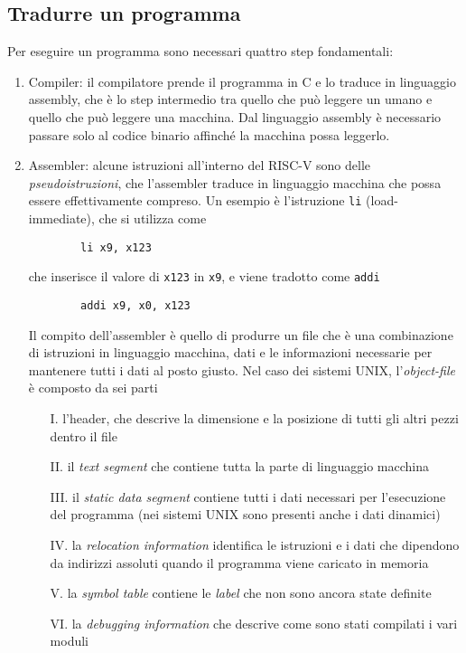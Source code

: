 \documentclass[a4paper,12pt]{article}
\theoremstyle{break}
\newcommand{\code}[1]{\texttt{#1}}
\numberwithin{equation}{section}
\begin{document}
\subsection{Tradurre un programma}
Per eseguire un programma sono necessari quattro step fondamentali:
\begin{enumerate}
    \item Compiler: il compilatore prende il programma in C e lo traduce in linguaggio assembly, che è lo step intermedio tra quello che può leggere un umano e quello che può leggere una macchina. Dal linguaggio assembly è necessario passare solo al codice binario affinché la macchina possa leggerlo.
    \item Assembler: alcune istruzioni all'interno del RISC-V sono delle \textit{pseudoistruzioni}, che l'assembler traduce in linguaggio macchina che possa essere effettivamente compreso. Un esempio è l'istruzione \code{li} (load-immediate), che si utilizza come 
    \begin{verbatim}
        li x9, x123
    \end{verbatim}
    che inserisce il valore di \code{x123} in \code{x9}, e viene tradotto come \code{addi} 
    \begin{verbatim}
        addi x9, x0, x123
    \end{verbatim}
    Il compito dell'assembler è quello di produrre un file che è una combinazione di istruzioni in linguaggio macchina, dati e le informazioni necessarie per mantenere tutti i dati al posto giusto.  
    Nel caso dei sistemi UNIX, l'\textit{object-file} è composto da sei parti
    \begin{enumerate}
        \item[I.] l'header, che descrive la dimensione e la posizione di tutti gli altri pezzi dentro il file
        \item[II.] il \textit{text segment} che contiene tutta la parte di linguaggio macchina
        \item[III.] il \textit{static data segment} contiene tutti i dati necessari per l'esecuzione del programma (nei sistemi UNIX sono presenti anche i dati dinamici)
        \item[IV.] la \textit{relocation information} identifica le istruzioni e i dati che dipendono da indirizzi assoluti quando il programma viene caricato in memoria
        \item[V.] la \textit{symbol table} contiene le \textit{label} che non sono ancora state definite 
        \item[VI.] la \textit{debugging information} che descrive come sono stati compilati i vari moduli  

\end{enumerate}
\end{enumerate}
\end{document}
